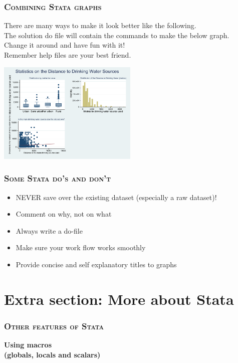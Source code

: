 \documentclass[10pt]{beamer}
\begin{document}
	\begin{frame}
	\frametitle{\textsc{Combining Stata graphs}}
		There are many ways to make it look better like the following. \\
		The solution do file will contain the commands to make the below graph. \\
		Change it around and have fun with it! \\
		Remember help files are your best friend.
	
\begin{center}
    \includegraphics[width=0.5\textwidth]{combined_better.pdf}
\end{center}
	\end{frame}

		\begin{frame}
	\frametitle{\textsc{Some Stata do's and don't}}
	\begin{itemize}
		  \item NEVER save over the existing dataset (especially a raw dataset)!
		  \item Comment on why, not on what
		  \item Always write a do-file
		  \item Make sure your work flow works smoothly
		  \item Provide concise and self explanatory titles to graphs
	  \end{itemize}
	 \end{frame}			
	\section{Extra section: More about Stata}
	
	\begin{frame}
	\frametitle{\textsc{Other features of Stata}}
		\begin{center}
		\Large \textbf{Using macros \\ (globals, locals and scalars)}
		\end{center}
	\end{frame}
\end{document}
